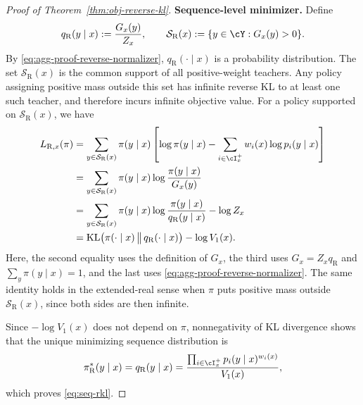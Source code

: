 \documentclass[11pt]{article}
\newcommand{\KL}{\text{KL}}
\newcommand{\pir}{\pi_{\mathrm{R}}}
\begin{document}
\begin{proof}[Proof of Theorem~\ref{thm:obj-reverse-kl}]
\textbf{Sequence-level minimizer.}
Define
\begin{align*}
    q_{\mathrm R}(y\mid x):=\frac{G_x(y)}{Z_x},
    \qquad
    \mathcal S_{\mathrm R}(x):=\{y\in\cY:G_x(y)>0\}.
\end{align*}
By \eqref{eq:agg-proof-reverse-normalizer},
$q_{\mathrm R}(\cdot\mid x)$ is a probability distribution.
The set $\mathcal S_{\mathrm R}(x)$ is the common support of
all positive-weight teachers. Any policy assigning positive
mass outside this set has infinite reverse KL to at least one
such teacher, and therefore incurs infinite objective value.
For a policy supported on $\mathcal S_{\mathrm R}(x)$, we have
\begin{align}
    L_{\mathrm R,x}(\pi)
    &=\sum_{y\in\mathcal S_{\mathrm R}(x)}\pi(y\mid x)
      \left[\log\pi(y\mid x)
      -\sum_{i\in\cI_x^+}w_i(x)\log p_i(y\mid x)\right]
      \notag\\*
    &=\sum_{y\in\mathcal S_{\mathrm R}(x)}\pi(y\mid x)
      \log\frac{\pi(y\mid x)}{G_x(y)}\notag\\*
    &=\sum_{y\in\mathcal S_{\mathrm R}(x)}\pi(y\mid x)
      \log\frac{\pi(y\mid x)}{q_{\mathrm R}(y\mid x)}-\log Z_x
      \notag\\*
    &=\KL\bigl(\pi(\cdot\mid x)
      \,\big\|\,q_{\mathrm R}(\cdot\mid x)\bigr)-\log V_1(x).
    \label{eq:agg-proof-reverse-decomposition}
\end{align}
Here, the second equality uses the definition of $G_x$, the
third uses $G_x=Z_xq_{\mathrm R}$ and
$\sum_y\pi(y\mid x)=1$, and the last uses
\eqref{eq:agg-proof-reverse-normalizer}. The same identity holds
in the extended-real sense when $\pi$ puts positive mass
outside $\mathcal S_{\mathrm R}(x)$, since both sides are
then infinite.

Since $-\log V_1(x)$ does not depend on $\pi$, nonnegativity
of KL divergence shows that the unique minimizing sequence
distribution is
\begin{align*}
    \pir^*(y\mid x)
    =q_{\mathrm R}(y\mid x)
    =\frac{\prod_{i\in\cI_x^+}p_i(y\mid x)^{w_i(x)}}{V_1(x)},
\end{align*}
which proves \eqref{eq:seq-rkl}.


\end{proof}
\end{document}
